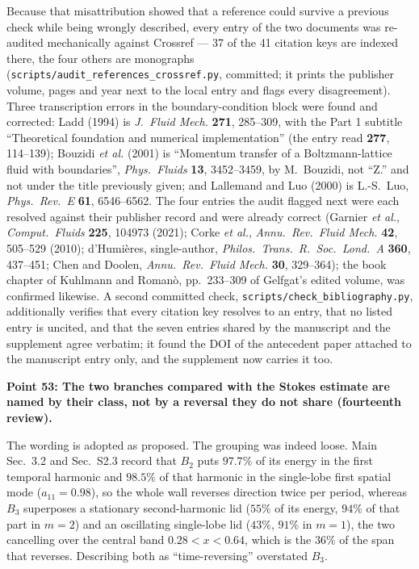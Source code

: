 \documentclass[11pt,a4paper]{article}
\newcommand{\brk}{\hspace{0pt}}
\begin{document}
Because that misattribution showed that a reference could survive a previous check
while being wrongly described, every entry of the two documents was re-audited
mechanically against Crossref --- 37 of the 41 citation keys are indexed there, the four
others are monographs
(\texttt{scripts/}\brk\texttt{audit\_references\_crossref.py}, committed; it prints the
publisher volume, pages and year next to the local entry and flags every
disagreement). Three transcription errors in the boundary-condition block were found
and corrected: Ladd (1994) is \emph{J.\ Fluid Mech.} \textbf{271}, 285--309, with the
Part 1 subtitle ``Theoretical foundation and numerical implementation'' (the entry read
\textbf{277}, 114--139); Bouzidi \emph{et al.} (2001) is ``Momentum transfer of a
Boltzmann-lattice fluid with boundaries'', \emph{Phys.\ Fluids} \textbf{13},
3452--3459, by M.~Bouzidi, not ``Z.'' and not under the title previously given; and
Lallemand and Luo (2000) is L.-S.~Luo, \emph{Phys.\ Rev.\ E} \textbf{61}, 6546--6562.
The four entries the audit flagged next were each resolved against their publisher
record and were already correct (Garnier \emph{et al.}, \emph{Comput.\ Fluids}
\textbf{225}, 104973 (2021); Corke \emph{et al.}, \emph{Annu.\ Rev.\ Fluid Mech.}
\textbf{42}, 505--529 (2010); d'Humi\`eres, single-author, \emph{Philos.\ Trans.\ R.\
Soc.\ Lond.\ A} \textbf{360}, 437--451; Chen and Doolen, \emph{Annu.\ Rev.\ Fluid
Mech.} \textbf{30}, 329--364); the book chapter of Kuhlmann and Roman\`o, pp.\
233--309 of Gelfgat's edited volume, was confirmed likewise. A second committed check,
\texttt{scripts/}\brk\texttt{check\_bibliography.py}, additionally verifies that every
citation key resolves to an entry, that no listed entry is uncited, and that the
seven entries shared by the manuscript and the supplement agree verbatim; it found the
DOI of the antecedent paper attached to the manuscript entry only, and the supplement
now carries it too.

\vspace{1em}

\noindent\textbf{Point 53: The two branches compared with the Stokes estimate are
named by their class, not by a reversal they do not share (fourteenth review).}

The wording is adopted as proposed. The grouping was indeed loose. Main Sec.~3.2 and
Sec.~S2.3 record that \(B_2\) puts \(97.7\%\) of its energy in the first temporal
harmonic and \(98.5\%\) of that harmonic in the single-lobe first spatial mode
(\(a_{11}=0.98\)), so the whole wall reverses direction twice per period, whereas
\(B_3\) superposes a stationary second-harmonic lid (\(55\%\) of its energy, \(94\%\)
of that part in \(m=2\)) and an oscillating single-lobe lid (\(43\%\), \(91\%\) in
\(m=1\)), the two cancelling over the central band \(0.28<x<0.64\), which is the
\(36\%\) of the span that reverses. Describing both as ``time-reversing'' overstated
\(B_3\).
\end{document}
